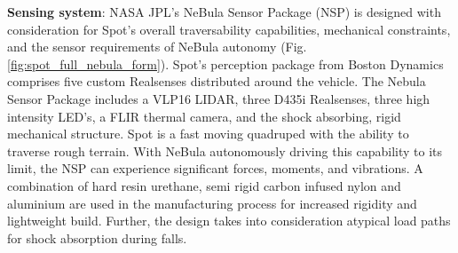 \documentclass[a4paper, 10pt, conference]{ieeeconf}      %
\newcommand{\ph}[1]{{\textbf{#1}:}} %
\begin{document}


\ph{Sensing system} NASA JPL's NeBula Sensor Package (NSP) is designed with consideration for Spot’s overall traversability capabilities, mechanical constraints, and the sensor requirements of NeBula autonomy (Fig. \ref{fig:spot_full_nebula_form}). Spot's perception package from Boston Dynamics comprises five custom Realsenses distributed around the vehicle. The Nebula Sensor Package includes a VLP16 LIDAR, three D435i Realsenses, three high intensity LED's, a FLIR thermal camera, and the shock absorbing, rigid mechanical structure. Spot is a fast moving quadruped with the ability to traverse rough terrain. With NeBula autonomously driving this capability to its limit, the NSP can experience significant forces, moments, and vibrations. A combination of hard resin urethane, semi rigid carbon infused nylon and aluminium are used in the manufacturing process for increased rigidity and lightweight build. %
Further, the design takes into consideration atypical load paths for shock absorption during falls. %
\end{document}
